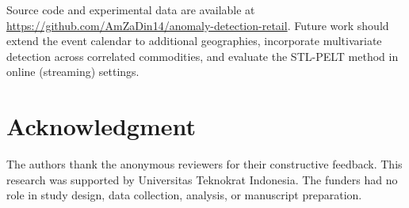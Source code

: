 \documentclass[10pt]{article}
\begin{document}
Source code and experimental data are available at \url{https://github.com/AmZaDin14/anomaly-detection-retail}. Future work should extend the event calendar to additional geographies, incorporate multivariate detection across correlated commodities, and evaluate the STL-PELT method in online (streaming) settings.

\section*{Acknowledgment}
The authors thank the anonymous reviewers for their constructive feedback. This research was supported by Universitas Teknokrat Indonesia. The funders had no role in study design, data collection, analysis, or manuscript preparation.
\end{document}
